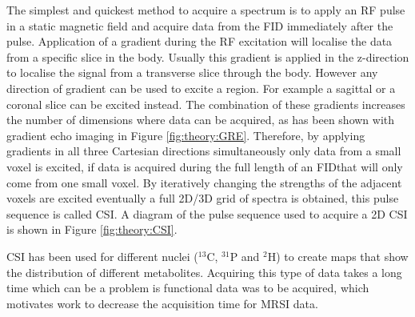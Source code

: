 The simplest and quickest method to acquire a spectrum is to apply an \ac{RF} pulse in a static magnetic field and acquire data from the FID immediately after the pulse. Application of a gradient during the \ac{RF} excitation will localise the data from a specific slice in the body. Usually this gradient is applied in the z-direction to localise the signal from a transverse slice through the body. However any direction of gradient can be used to excite a region. For example a sagittal or a coronal slice can be excited instead. The combination of these gradients increases the number of dimensions where data can be acquired, as has been shown with gradient echo imaging in Figure \ref{fig:theory:GRE}. Therefore, by applying gradients in all three Cartesian directions simultaneously only data from a small voxel is excited, if data is acquired during the full length of an \ac{FID}that will only come from one small voxel. By iteratively changing the strengths of the adjacent voxels are excited eventually a full 2D/3D grid of spectra is obtained, this pulse sequence is called \ac{CSI}. A diagram of the pulse sequence used to acquire a 2D \ac{CSI} is shown in Figure \ref{fig:theory:CSI}.

\ac{CSI} has been used for different nuclei ($^{13}$C, $^{31}$P and $^2$H) to create maps that show the distribution of different metabolites. Acquiring this type of data takes a long time which can be a problem is functional data was to be acquired, which motivates work to decrease the acquisition time for \ac{MRSI} data.



